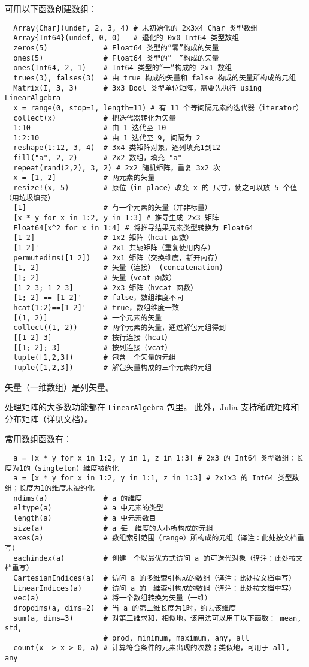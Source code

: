 \documentclass[10pt,a4paper]{article}
\begin{document}
可用以下函数创建数组：
\begin{lstlisting}
  Array{Char}(undef, 2, 3, 4) # 未初始化的 2x3x4 Char 类型数组
  Array{Int64}(undef, 0, 0)   # 退化的 0x0 Int64 类型数组
  zeros(5)             # Float64 类型的“零”构成的矢量
  ones(5)              # Float64 类型的“一”构成的矢量
  ones(Int64, 2, 1)    # Int64 类型的“一”构成的 2x1 数组
  trues(3), falses(3)  # 由 true 构成的矢量和 false 构成的矢量所构成的元组
  Matrix(I, 3, 3)      # 3x3 Bool 类型单位矩阵，需要先执行 using LinearAlgebra
  x = range(0, stop=1, length=11) # 有 11 个等间隔元素的迭代器（iterator）
  collect(x)           # 把迭代器转化为矢量
  1:10                 # 由 1 迭代至 10
  1:2:10               # 由 1 迭代至 9, 间隔为 2
  reshape(1:12, 3, 4)  # 3x4 类矩阵对象，逐列填充1到12
  fill("a", 2, 2)      # 2x2 数组，填充 "a"
  repeat(rand(2,2), 3, 2) # 2x2 随机矩阵，重复 3x2 次
  x = [1, 2]           # 两元素的矢量
  resize!(x, 5)        # 原位（in place）改变 x 的 尺寸，使之可以放 5 个值（用垃圾填充）
  [1]                  # 有一个元素的矢量（并非标量）
  [x * y for x in 1:2, y in 1:3] # 推导生成 2x3 矩阵
  Float64[x^2 for x in 1:4] # 将推导结果元素类型转换为 Float64
  [1 2]                # 1x2 矩阵（hcat 函数）
  [1 2]'               # 2x1 共轭矩阵（重复使用内存）
  permutedims([1 2])   # 2x1 矩阵（交换维度，新开内存）
  [1, 2]               # 矢量（连接） (concatenation)
  [1; 2]               # 矢量（vcat 函数）
  [1 2 3; 1 2 3]       # 2x3 矩阵（hvcat 函数）
  [1; 2] == [1 2]'     # false，数组维度不同
  hcat(1:2)==[1 2]'    # true，数组维度一致
  [(1, 2)]             # 一个元素的矢量
  collect((1, 2))      # 两个元素的矢量，通过解包元组得到
  [[1 2] 3]            # 按行连接（hcat）
  [[1; 2]; 3]          # 按列连接（vcat）
  tuple([1,2,3])       # 包含一个矢量的元组
  Tuple([1,2,3])       # 解包矢量构成的三个元素的元组
\end{lstlisting}
矢量（一维数组）是列矢量。

处理矩阵的大多数功能都在 \lstinline|LinearAlgebra| 包里。
此外，Julia 支持稀疏矩阵和分布矩阵（详见文档）。

常用数组函数有：
\begin{lstlisting}
  a = [x * y for x in 1:2, y in 1, z in 1:3] # 2x3 的 Int64 类型数组；长度为1的（singleton）维度被约化
  a = [x * y for x in 1:2, y in 1:1, z in 1:3] # 2x1x3 的 Int64 类型数组；长度为1的维度未被约化
  ndims(a)             # a 的维度
  eltype(a)            # a 中元素的类型
  length(a)            # a 中元素数目
  size(a)              # a 每一维度的大小所构成的元组
  axes(a)              # 数组索引范围（range）所构成的元组（译注：此处按文档重写）
  eachindex(a)         # 创建一个以最优方式访问 a 的可迭代对象（译注：此处按文档重写）
  CartesianIndices(a)  # 访问 a 的多维索引构成的数组（译注：此处按文档重写）
  LinearIndices(a)     # 访问 a 的一维索引构成的数组（译注：此处按文档重写）
  vec(a)               # 将一个数组转换为矢量（一维）
  dropdims(a, dims=2)  # 当 a 的第二维长度为1时，约去该维度
  sum(a, dims=3)       # 对第三维求和，相似地，该用法可以用于以下函数： mean, std,
                       # prod, minimum, maximum, any, all
  count(x -> x > 0, a) # 计算符合条件的元素出现的次数；类似地，可用于 all, any
\end{lstlisting}
\end{document}
